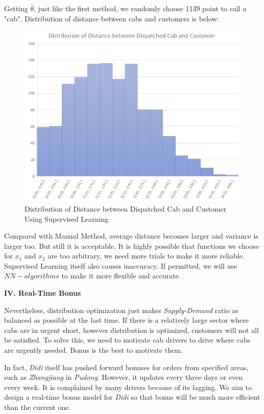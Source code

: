 \documentclass{article}
\begin{document}
\qquad Getting \(\hat{\theta}\), just like the first method, we randomly choose 1139 point to call a "cab". Distribution of distance between cabs and customers is below:
\pagebreak

\begin{figure}[htbp]
	\centering
	\includegraphics[width = 35em]{Distribution_2.JPG}
	\caption{Distribution of Distance between Dispatched Cab and Customer Using Supervised Learning}
\end{figure}

\qquad Compared with Manual Method, average distance becomes larger and variance is larger too. But still it is acceptable. It is highly possible that functions we choose for \(x_1\) and \(x_2\) are too arbitrary, we need more trials to make it more reliable. Supervised Learning itself also causes inaccuracy. If permitted, we will use \(NN-algorithms\) to make it more flexible and accurate.

\begin{center}
	\textbf{IV. Real-Time Bonus}
\end{center}

\qquad Nevertheless, distribution optimization just makes \emph{Supply-Demand} ratio as balanced as possible at the last time. If there is a relatively large sector where cabs are in urgent short, however distribution is optimized, customers will not all be satisfied. To solve this, we need to motivate cab drivers to drive where cabs are urgently needed. Bonus is the best to motivate them.

\qquad In fact, \emph{Didi} itself has pushed forward bonuses for orders from specified areas, such as \emph{Zhangjiang} in \emph{Pudong}. However, it updates every three days or even every week. It is complained by many drivers because of its lagging. We aim to design a real-time bonus model for \emph{Didi} so that bonus will be much more efficient than the current one.
\end{document}
